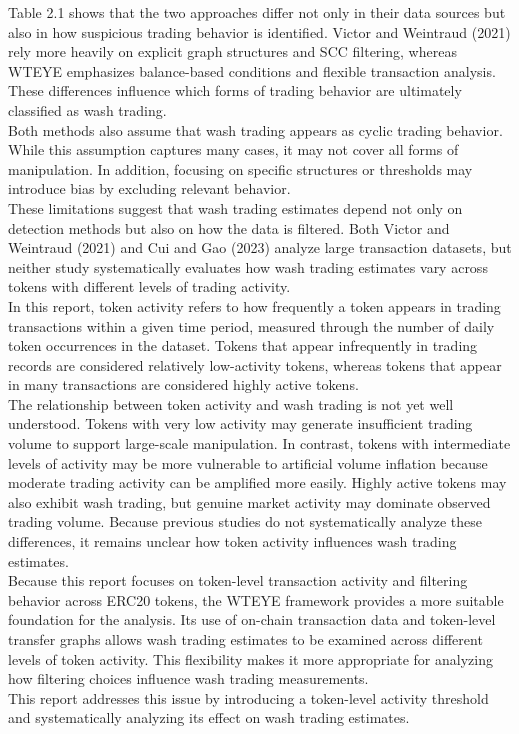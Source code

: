 \documentclass[language=english,thesis=bachelor,nosecondtitle,onesided,faculty=cb]{hsmw-thesis}
\begin{document}
Table 2.1 shows that the two approaches differ not only in their data sources but also in how suspicious trading behavior is identified. Victor and Weintraud (2021) rely more heavily on explicit graph structures and SCC filtering, whereas WTEYE emphasizes balance-based conditions and flexible transaction analysis. These differences influence which forms of trading behavior are ultimately classified as wash trading.\\
Both methods also assume that wash trading appears as cyclic trading behavior. While this assumption captures many cases, it may not cover all forms of manipulation. In addition, focusing on specific structures or thresholds may introduce bias by excluding relevant behavior.\\
These limitations suggest that wash trading estimates depend not only on detection methods but also on how the data is filtered. Both Victor and Weintraud (2021) and Cui and Gao (2023) analyze large transaction datasets, but neither study systematically evaluates how wash trading estimates vary across tokens with different levels of trading activity.\\
In this report, token activity refers to how frequently a token appears in trading transactions within a given time period, measured through the number of daily token occurrences in the dataset. Tokens that appear infrequently in trading records are considered relatively low-activity tokens, whereas tokens that appear in many transactions are considered highly active tokens.\\
The relationship between token activity and wash trading is not yet well understood. Tokens with very low activity may generate insufficient trading volume to support large-scale manipulation. In contrast, tokens with intermediate levels of activity may be more vulnerable to artificial volume inflation because moderate trading activity can be amplified more easily. Highly active tokens may also exhibit wash trading, but genuine market activity may dominate observed trading volume. Because previous studies do not systematically analyze these differences, it remains unclear how token activity influences wash trading estimates.\\
Because this report focuses on token-level transaction activity and filtering behavior across ERC20 tokens, the WTEYE framework provides a more suitable foundation for the analysis. Its use of on-chain transaction data and token-level transfer graphs allows wash trading estimates to be examined across different levels of token activity. This flexibility makes it more appropriate for analyzing how filtering choices influence wash trading measurements.\\
This report addresses this issue by introducing a token-level activity threshold and systematically analyzing its effect on wash trading estimates.\\
\end{document}
